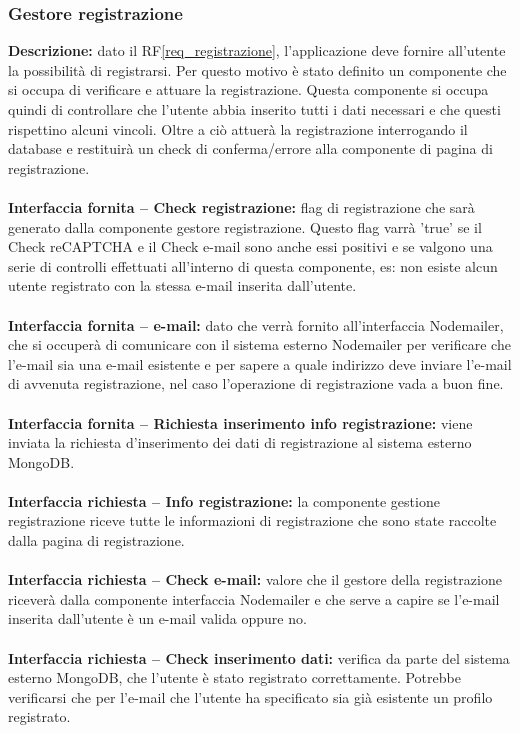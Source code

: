 \subsubsection{Gestore registrazione}
\textbf{Descrizione: }dato il RF\ref{req_registrazione}, l'applicazione deve fornire all'utente la possibilità di registrarsi. Per questo motivo è stato definito un componente che si occupa di verificare e attuare la registrazione. Questa componente si occupa quindi di controllare che l'utente abbia inserito tutti i dati necessari e che questi rispettino alcuni vincoli. Oltre a ciò attuerà la registrazione interrogando il database e restituirà un check di conferma/errore alla componente di pagina di registrazione.  \\
\\
\textbf{Interfaccia fornita – Check registrazione: }flag di registrazione che sarà generato dalla componente gestore registrazione. Questo flag varrà 'true' se il Check reCAPTCHA e il Check e-mail sono anche essi positivi e se valgono una serie di controlli effettuati all'interno di questa componente, es: non esiste alcun utente registrato con la stessa e-mail inserita dall'utente. \\
\\
\textbf{Interfaccia fornita – e-mail: }dato che verrà fornito all'interfaccia Nodemailer, che si occuperà di comunicare con il sistema esterno Nodemailer per verificare che l'e-mail sia una e-mail esistente e per sapere a quale indirizzo deve inviare l'e-mail di avvenuta registrazione, nel caso l'operazione di registrazione vada a buon fine. \\
\\
\textbf{Interfaccia fornita – Richiesta inserimento info registrazione:} viene inviata la richiesta d'inserimento dei dati di registrazione al sistema esterno MongoDB. \\
\\
\textbf{Interfaccia richiesta – Info registrazione:} la componente gestione registrazione riceve tutte le informazioni di registrazione che sono state raccolte dalla pagina di registrazione. \\
\\
\textbf{Interfaccia richiesta – Check e-mail:} valore che il gestore della registrazione riceverà dalla componente interfaccia Nodemailer e che serve a capire se l'e-mail inserita dall'utente è un e-mail valida oppure no. \\
\\
\textbf{Interfaccia richiesta – Check inserimento dati: }verifica da parte del sistema esterno MongoDB, che l'utente è stato registrato correttamente. Potrebbe verificarsi che per l'e-mail che l'utente ha specificato sia già esistente un profilo registrato. \\
